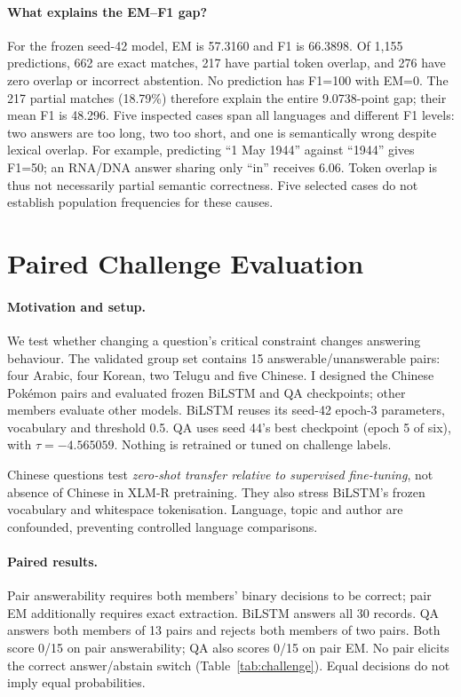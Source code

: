 \documentclass[11pt]{article}
\begin{document}
\paragraph{What explains the EM--F1 gap?}
For the frozen seed-42 model, EM is 57.3160 and F1 is 66.3898. Of 1,155 predictions, 662 are exact matches, 217 have partial token overlap, and 276 have zero overlap or incorrect abstention. No prediction has F1=100 with EM=0. The 217 partial matches (18.79\%) therefore explain the entire 9.0738-point gap; their mean F1 is 48.296. Five inspected cases span all languages and different F1 levels: two answers are too long, two too short, and one is semantically wrong despite lexical overlap. For example, predicting ``1 May 1944'' against ``1944'' gives F1=50; an RNA/DNA answer sharing only ``in'' receives 6.06. Token overlap is thus not necessarily partial semantic correctness. Five selected cases do not establish population frequencies for these causes.

\section{Paired Challenge Evaluation}
\label{sec:challenge}
\paragraph{Motivation and setup.}
We test whether changing a question's critical constraint changes answering behaviour. The validated group set contains 15 answerable/unanswerable pairs: four Arabic, four Korean, two Telugu and five Chinese. I designed the Chinese Pok\'emon pairs and evaluated frozen BiLSTM and QA checkpoints; other members evaluate other models. BiLSTM reuses its seed-42 epoch-3 parameters, vocabulary and threshold 0.5. QA uses seed 44's best checkpoint (epoch 5 of six), with $\tau=-4.565059$. Nothing is retrained or tuned on challenge labels.

Chinese questions test \emph{zero-shot transfer relative to supervised fine-tuning}, not absence of Chinese in XLM-R pretraining. They also stress BiLSTM's frozen vocabulary and whitespace tokenisation. Language, topic and author are confounded, preventing controlled language comparisons.

\paragraph{Paired results.}
Pair answerability requires both members' binary decisions to be correct; pair EM additionally requires exact extraction. BiLSTM answers all 30 records. QA answers both members of 13 pairs and rejects both members of two pairs. Both score 0/15 on pair answerability; QA also scores 0/15 on pair EM. No pair elicits the correct answer/abstain switch (Table~\ref{tab:challenge}). Equal decisions do not imply equal probabilities.
\end{document}
